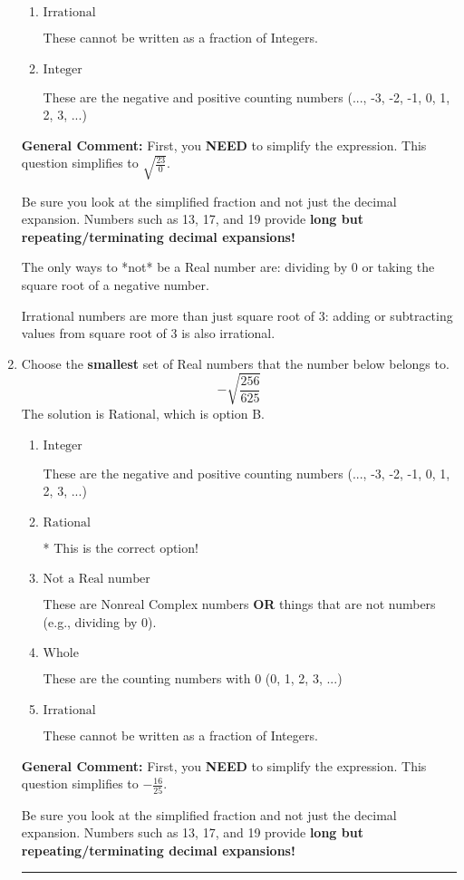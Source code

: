 \documentclass{extbook}[14pt]
\newcommand{\litem}[1]{\item #1

\rule{\textwidth}{0.4pt}}
\begin{document}
\begin{enumerate}
{\begin{enumerate}[label=\Alph*.]
These are numbers that can be written as fraction of Integers (e.g., -2/3)
\item \( \text{Irrational} \)

These cannot be written as a fraction of Integers.
\item \( \text{Integer} \)

These are the negative and positive counting numbers (..., -3, -2, -1, 0, 1, 2, 3, ...)
\end{enumerate}

\textbf{General Comment:} First, you \textbf{NEED} to simplify the expression. This question simplifies to $\sqrt{\frac{23}{0}}$. 
 
 Be sure you look at the simplified fraction and not just the decimal expansion. Numbers such as 13, 17, and 19 provide \textbf{long but repeating/terminating decimal expansions!} 
 
 The only ways to *not* be a Real number are: dividing by 0 or taking the square root of a negative number. 
 
 Irrational numbers are more than just square root of 3: adding or subtracting values from square root of 3 is also irrational.
}
\litem{
Choose the \textbf{smallest} set of Real numbers that the number below belongs to.
\[ -\sqrt{\frac{256}{625}} \]The solution is \( \text{Rational} \), which is option B.\begin{enumerate}[label=\Alph*.]
\item \( \text{Integer} \)

These are the negative and positive counting numbers (..., -3, -2, -1, 0, 1, 2, 3, ...)
\item \( \text{Rational} \)

* This is the correct option!
\item \( \text{Not a Real number} \)

These are Nonreal Complex numbers \textbf{OR} things that are not numbers (e.g., dividing by 0).
\item \( \text{Whole} \)

These are the counting numbers with 0 (0, 1, 2, 3, ...)
\item \( \text{Irrational} \)

These cannot be written as a fraction of Integers.
\end{enumerate}

\textbf{General Comment:} First, you \textbf{NEED} to simplify the expression. This question simplifies to $-\frac{16}{25}$. 
 
 Be sure you look at the simplified fraction and not just the decimal expansion. Numbers such as 13, 17, and 19 provide \textbf{long but repeating/terminating decimal expansions!} 
 
}
\end{enumerate}
\end{document}
